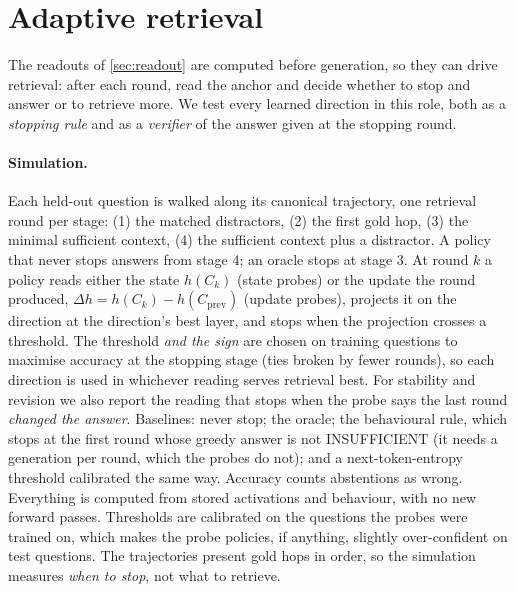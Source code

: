 \section{Adaptive retrieval}
\label{app:adaptive}
The readouts of \cref{sec:readout} are computed before generation, so they can drive retrieval: after each round, read the anchor and decide whether to stop and answer or to retrieve more. We test every learned direction in this role, both as a \emph{stopping rule} and as a \emph{verifier} of the answer given at the stopping round.

\paragraph{Simulation.} Each held-out question is walked along its canonical trajectory, one retrieval round per stage: (1) the matched distractors, (2) the first gold hop, (3) the minimal sufficient context, (4) the sufficient context plus a distractor. A policy that never stops answers from stage 4; an oracle stops at stage 3. At round $k$ a policy reads either the state $h(C_k)$ (state probes) or the update the round produced, $\Delta h=h(C_k)-h(C_{\text{prev}})$ (update probes), projects it on the direction at the direction's best layer, and stops when the projection crosses a threshold. The threshold \emph{and the sign} are chosen on training questions to maximise accuracy at the stopping stage (ties broken by fewer rounds), so each direction is used in whichever reading serves retrieval best. For stability and revision we also report the reading that stops when the probe says the last round \emph{changed the answer}. Baselines: never stop; the oracle; the behavioural rule, which stops at the first round whose greedy answer is not INSUFFICIENT (it needs a generation per round, which the probes do not); and a next-token-entropy threshold calibrated the same way. Accuracy counts abstentions as wrong. Everything is computed from stored activations and behaviour, with no new forward passes. Thresholds are calibrated on the questions the probes were trained on, which makes the probe policies, if anything, slightly over-confident on test questions. The trajectories present gold hops in order, so the simulation measures \emph{when to stop}, not what to retrieve.

\begin{table}[t]
\centering\scriptsize
\setlength{\tabcolsep}{3pt}
\resizebox{\linewidth}{!}{}
\caption{Every direction as a stopping rule: accuracy at the stopping round (mean rounds in parentheses), held-out questions of the document split. Bold: best non-oracle rule per column. $^{-}$: the training-optimal reading stops when the projection is \emph{low}. $^{+}$: the 95\% paired bootstrap interval of the accuracy difference to the behavioural rule lies above zero (1{,}000 resamples of test questions).}
\label{tab:adaptive}
\end{table}

